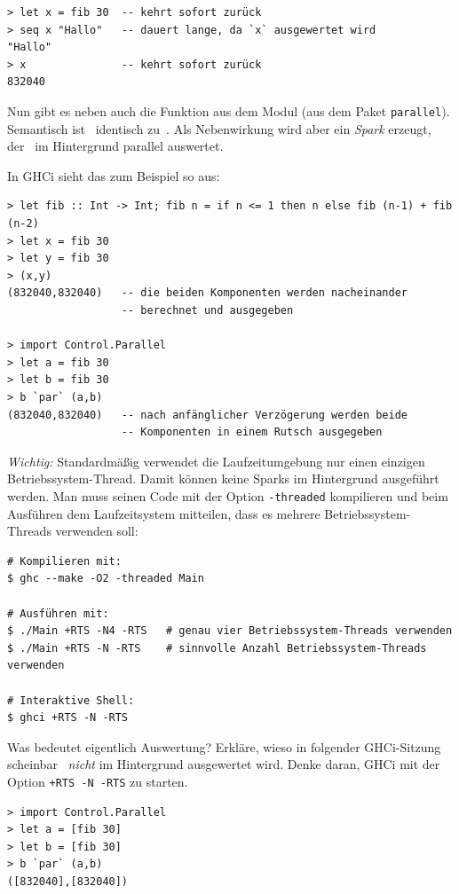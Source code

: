 \documentclass{uebblatt}
\begin{document}
\begin{verbatim}
> let x = fib 30  -- kehrt sofort zurück
> seq x "Hallo"   -- dauert lange, da `x` ausgewertet wird
"Hallo"
> x               -- kehrt sofort zurück
832040
\end{verbatim}

Nun gibt es neben  auch die Funktion  aus dem Modul  (aus dem Paket
\texttt{parallel}). Semantisch ist~ identisch
zu~. Als Nebenwirkung wird aber ein \emph{Spark} erzeugt,
der~ im Hintergrund parallel auswertet.

In GHCi sieht das zum Beispiel so aus:

\begin{verbatim}
> let fib :: Int -> Int; fib n = if n <= 1 then n else fib (n-1) + fib (n-2)
> let x = fib 30
> let y = fib 30
> (x,y)
(832040,832040)   -- die beiden Komponenten werden nacheinander
                  -- berechnet und ausgegeben

> import Control.Parallel
> let a = fib 30
> let b = fib 30
> b `par` (a,b)
(832040,832040)   -- nach anfänglicher Verzögerung werden beide
                  -- Komponenten in einem Rutsch ausgegeben
\end{verbatim}

\emph{Wichtig:} Standardmäßig verwendet die Laufzeitumgebung nur einen einzigen
Betriebssystem-Thread. Damit können keine Sparks im Hintergrund ausgeführt
werden. Man muss seinen Code mit der Option \texttt{-threaded} kompilieren und
beim Ausführen dem Laufzeitsystem mitteilen, dass es mehrere
Betriebssystem-Threads verwenden soll:

\begin{verbatim}
# Kompilieren mit:
$ ghc --make -O2 -threaded Main

# Ausführen mit:
$ ./Main +RTS -N4 -RTS   # genau vier Betriebssystem-Threads verwenden
$ ./Main +RTS -N -RTS    # sinnvolle Anzahl Betriebssystem-Threads verwenden

# Interaktive Shell:
$ ghci +RTS -N -RTS
\end{verbatim}

\begin{aufgabe}{Was bedeutet eigentlich Auswertung?}
Erkläre, wieso in folgender GHCi-Sitzung scheinbar~
\emph{nicht} im Hintergrund ausgewertet wird. Denke daran, GHCi mit der Option
\texttt{+RTS -N -RTS} zu starten.

\begin{verbatim}
> import Control.Parallel
> let a = [fib 30]
> let b = [fib 30]
> b `par` (a,b)
([832040],[832040])
\end{verbatim}
\end{aufgabe}
\end{document}
